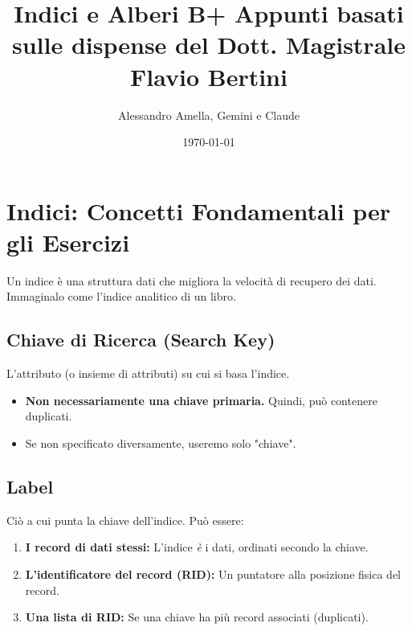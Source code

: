 

\usepackage{hyperref}

\title{Indici e Alberi B+
  \large Appunti basati sulle dispense del Dott. Magistrale Flavio Bertini}
\author{Alessandro Amella, Gemini e Claude}
\date{\today}



\maketitle
\tableofcontents
\newpage

\section{Indici: Concetti Fondamentali per gli Esercizi}
Un indice è una struttura dati che migliora la velocità di recupero dei dati. Immaginalo come l'indice analitico di un libro.

\subsection{Chiave di Ricerca (Search Key)}
L'attributo (o insieme di attributi) su cui si basa l'indice.
\begin{itemize}
    \item \textbf{Non necessariamente una chiave primaria.} Quindi, può contenere duplicati.
    \item Se non specificato diversamente, useremo solo "chiave".
\end{itemize}

\subsection{Label}
Ciò a cui punta la chiave dell'indice. Può essere:
\begin{enumerate}
    \item \textbf{I record di dati stessi:} L'indice \textit{è} i dati, ordinati secondo la chiave.
    \item \textbf{L'identificatore del record (RID):} Un puntatore alla posizione fisica del record.
    \item \textbf{Una lista di RID:} Se una chiave ha più record associati (duplicati).
\end{enumerate}

